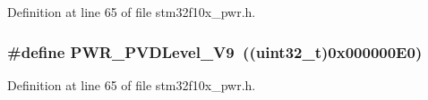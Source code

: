 Definition at line 65 of file stm32f10x\+\_\+pwr.\+h.

\subsubsection[{\texorpdfstring{P\+W\+R\+\_\+\+P\+V\+D\+Level\+\_\+2\+V9}{PWR_PVDLevel_2V9}}]{\setlength{\rightskip}{0pt plus 5cm}\#define P\+W\+R\+\_\+\+P\+V\+D\+Level\+\_\+V9~(({\bf uint32\+\_\+t})0x000000\+E0)}\hypertarget{group___p_v_d__detection__level_ga9c156a7155f9946c0d3a73794f51a1ce}{}\label{group___p_v_d__detection__level_ga9c156a7155f9946c0d3a73794f51a1ce}


Definition at line 65 of file stm32f10x\+\_\+pwr.\+h.


